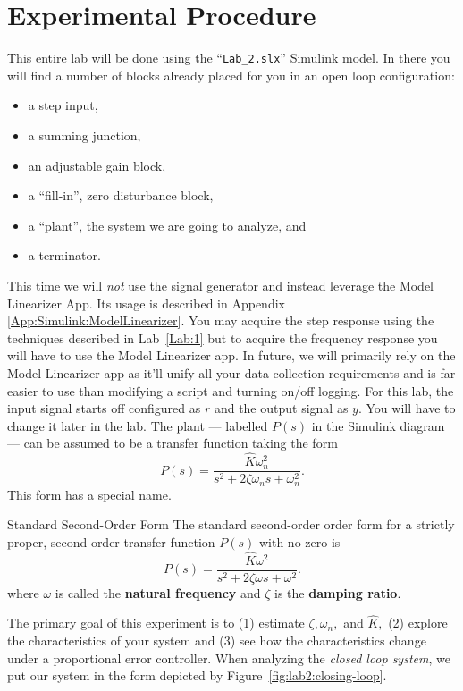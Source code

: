 \section{Experimental Procedure}
This entire lab will be done using the ``\texttt{Lab\_2.slx}'' Simulink model.
In there you will
find a number of blocks already placed for you in an open loop configuration:
\begin{itemize}
  \item{a step input,}
  \item{a summing junction,}
  \item{an adjustable gain block,}
  \item{a ``fill-in'', zero disturbance block,}
  \item{a ``plant'', the system we are going to analyze, and}
  \item{a terminator.}
\end{itemize}
This time we will \emph{not} use the signal generator and instead leverage
the Model Linearizer App. Its usage is described in Appendix
\ref{App:Simulink:ModelLinearizer}. You may acquire the step response
using the techniques described in Lab~\ref{Lab:1} but to acquire the frequency
response you will have to use the Model Linearizer app. In future, we will
primarily rely on the Model Linearizer app as it'll
unify all your data collection
requirements and is far easier to use than modifying a script and turning
on/off logging. For this lab, the input signal starts off configured
as \(r\) and the output signal as \(y.\) You will have to change it later
in the lab.
%
The plant --- labelled \(P(s)\) in the Simulink diagram --- can be assumed
to be a transfer function taking the form
\[
  P(s) = \frac{\hat{K}\omega_n^2}{s^2 + 2\zeta\omega_n s + \omega_n^2}.
\]
This form has a special name.
%
\begin{definition}[]{Standard Second-Order Form}
  The standard second-order order form for a strictly proper, second-order
  transfer function \(P(s)\) with no zero is
  \[
    P(s) = \frac{\hat{K} \omega^2}{s^2 + 2 \zeta \omega s + \omega^2}.
  \]
  where \(\omega\) is called the \textbf{natural frequency} and
  \(\zeta\) is the \textbf{damping ratio}.
\end{definition}
%
The primary goal of this experiment is to (1) estimate \(\zeta,\)\(\omega_n,\)
and \(\hat{K},\) (2) explore the characteristics of your system and
(3) see how the characteristics change under a proportional error controller.
When analyzing the \emph{closed loop system}, we put our system in the form
depicted by Figure~\ref{fig:lab2:closing-loop}.
